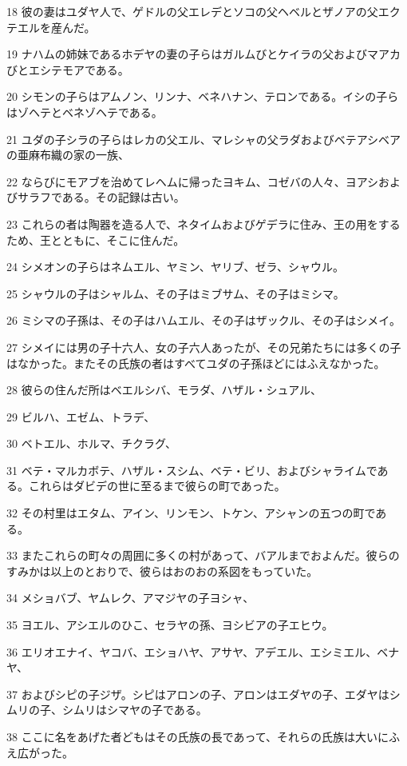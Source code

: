 \par 18 彼の妻はユダヤ人で、ゲドルの父エレデとソコの父ヘベルとザノアの父エクテエルを産んだ。
\par 19 ナハムの姉妹であるホデヤの妻の子らはガルムびとケイラの父およびマアカびとエシテモアである。
\par 20 シモンの子らはアムノン、リンナ、ベネハナン、テロンである。イシの子らはゾヘテとベネゾヘテである。
\par 21 ユダの子シラの子らはレカの父エル、マレシャの父ラダおよびベテアシベアの亜麻布織の家の一族、
\par 22 ならびにモアブを治めてレヘムに帰ったヨキム、コゼバの人々、ヨアシおよびサラフである。その記録は古い。
\par 23 これらの者は陶器を造る人で、ネタイムおよびゲデラに住み、王の用をするため、王とともに、そこに住んだ。
\par 24 シメオンの子らはネムエル、ヤミン、ヤリブ、ゼラ、シャウル。
\par 25 シャウルの子はシャルム、その子はミブサム、その子はミシマ。
\par 26 ミシマの子孫は、その子はハムエル、その子はザックル、その子はシメイ。
\par 27 シメイには男の子十六人、女の子六人あったが、その兄弟たちには多くの子はなかった。またその氏族の者はすべてユダの子孫ほどにはふえなかった。
\par 28 彼らの住んだ所はベエルシバ、モラダ、ハザル・シュアル、
\par 29 ビルハ、エゼム、トラデ、
\par 30 ベトエル、ホルマ、チクラグ、
\par 31 ベテ・マルカボテ、ハザル・スシム、ベテ・ビリ、およびシャライムである。これらはダビデの世に至るまで彼らの町であった。
\par 32 その村里はエタム、アイン、リンモン、トケン、アシャンの五つの町である。
\par 33 またこれらの町々の周囲に多くの村があって、バアルまでおよんだ。彼らのすみかは以上のとおりで、彼らはおのおの系図をもっていた。
\par 34 メショバブ、ヤムレク、アマジヤの子ヨシャ、
\par 35 ヨエル、アシエルのひこ、セラヤの孫、ヨシビアの子エヒウ。
\par 36 エリオエナイ、ヤコバ、エショハヤ、アサヤ、アデエル、エシミエル、ベナヤ、
\par 37 およびシピの子ジザ。シピはアロンの子、アロンはエダヤの子、エダヤはシムリの子、シムリはシマヤの子である。
\par 38 ここに名をあげた者どもはその氏族の長であって、それらの氏族は大いにふえ広がった。
